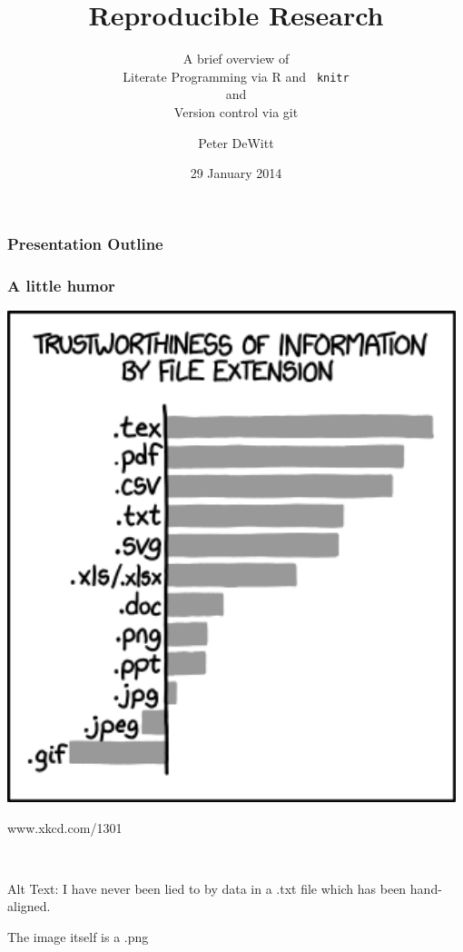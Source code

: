 \documentclass[t]{beamer}\usepackage[]{graphicx}\usepackage[]{color}
\title[Reproducible Research]{Reproducible Research}
\subtitle{A brief overview of\\Literate Programming via R and {\tt
knitr}\\and\\Version control via git}
\author{Peter DeWitt}
\institute{University of Colorado Anschutz Medical Campus 
 
Department of Biostatistics}
\date{29 January 2014}
\begin{document}
\begin{frame}[fragile]
  \titlepage
\end{frame}

\section*{} 
\begin{frame}
  \frametitle{Presentation Outline}
  \tableofcontents
\end{frame}

\begin{frame}
  \frametitle{A little humor}
  \begin{minipage}[m]{0.48\textwidth}
    \includegraphics[width=0.98\textwidth]{figure/file_extensions.png}
    \begin{center} 
       www.xkcd.com/1301
    \end{center}
  \end{minipage}
  ~
  \begin{minipage}[m]{0.48\textwidth}

       Alt Text: I have never been lied to by data in a .txt file which has been hand-aligned.

       The image itself is a .png
  \end{minipage} 
\end{frame}
\end{document}
